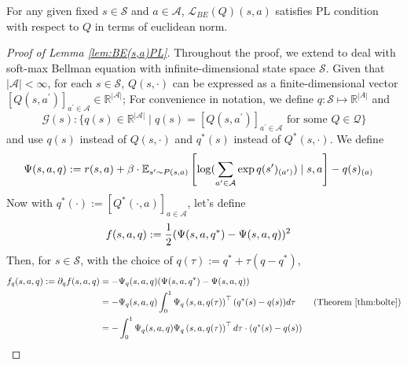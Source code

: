 \begin{lem}\label{lem:BE(s,a)PL} For any given fixed $s\in\mathcal{S}$ and $a\in\mathcal{A}$,
$\mathcal{L}_{BE}(Q)(s,a)$ satisfies PL condition with respect to $Q$ in terms of euclidean norm.
\end{lem}
\begin{proof}[Proof of Lemma \ref{lem:BE(s,a)PL}] Throughout the proof, we extend \cite{ruszczynski2024functional} to deal with soft-max Bellman equation with infinite-dimensional state space $\mathcal{S}$. Given that $|\mathcal{A}|<\infty$, 
for each $s\in\mathcal{S}$, $Q(s, \cdot)$ can be expressed as a finite-dimensional vector $\left[Q\left(s, a^{\prime}\right)\right]_{a^{\prime} \in \mathcal{A}}\in\mathbb{R}^{|\mathcal{A}|}$; For convenience in notation, we define $q:\mathcal{S}\mapsto \mathbb{R}^{|A|}$ and
$$\mathcal{G}(s): \{q(s)\in \mathbb{R}^{|\mathcal{A}|}\mid q(s) = \left[Q\left(s, a^{\prime}\right)\right]_{a^{\prime} \in \mathcal{A}} \text{ for some }Q\in\mathcal{Q}\}$$
and use $q(s)$ instead of $Q(s,\cdot)$ and $q^\ast(s)$ instead of $Q^\ast(s,\cdot)$. 
We define
 \begin{align}
 \Psi(s, a, q)&:= r(s,a) + \beta \cdot \mathbb{E}_{s^{\prime} \sim P(s, a)}\left[\log(\sum_{a^\prime\in\mathcal{A}}\exp q(s^\prime)_{(a^\prime)}) \mid s, a\right]- q(s)_{(a)} \notag
 \end{align}
Now with $q^\ast(\cdot) := \left[Q^\ast\left(\cdot, a\right)\right]_{a \in \mathcal{A}}$, let's define
\begin{align}
     f(s, a, q) &:= \frac{1}{2}(\Psi(s, a, q^\ast)-\Psi(s, a, q))^2 \notag
\end{align}
 Then, for $s\in\mathcal{S}$, with the choice of $q(\tau):= q^\ast + \tau(q-q^\ast)$,
\begin{align}
  f_q(s, a, q):= \partial_q f(s, a, q)&=-\Psi_q(s,a, q)(\Psi(s, a, q^\ast)-\Psi(s, a,q))\notag
    \\
    &= - \Psi_q(s, a, q) \int_0^1 \Psi_q\left(s,a, q(\tau)\right)^\top(q^\ast(s)-q(s))d\tau \tag{Theorem \ref{thm:bolte}}
    \\
    &= - \int_0^1 \Psi_q(s,a, q) \Psi_q\left(s, a, q(\tau)\right)^\top  d\tau \cdot (q^\ast(s)-q(s))\notag
\end{align}


\end{proof}
